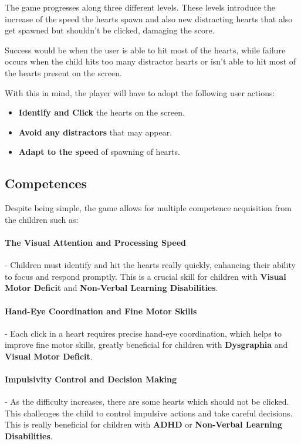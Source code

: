 The game progresses along three different levels. These levels introduce the increase of the speed the hearts spawn and also new distracting hearts that also get spawned but shouldn't be clicked, damaging the score.

Success would be when the user is able to hit most of the hearts, while failure occurs when the child hits too many distractor hearts or isn't able to hit most of the hearts present on the screen.

With this in mind, the player will have to adopt the following user actions:

\begin{itemize}
    \item \textbf{Identify and Click} the hearts on the screen.
    \item \textbf{Avoid any distractors} that may appear.
    \item \textbf{Adapt to the speed} of spawning of hearts.
\end{itemize}

\subsection*{Competences}
Despite being simple, the game allows for multiple competence acquisition from the children such as:

\paragraph{The Visual Attention and Processing Speed}- Children must identify and hit the hearts really quickly, enhancing their ability to focus and respond promptly. This is a crucial skill for children with \textbf{Visual Motor Deficit} and \textbf{Non-Verbal Learning Disabilities}.

\paragraph{Hand-Eye Coordination and Fine Motor Skills}- Each click in a heart requires precise hand-eye coordination, which helps to improve fine motor skills, greatly beneficial for children with \textbf{Dysgraphia} and \textbf{Visual Motor Deficit}.

\paragraph{Impulsivity Control and Decision Making}- As the difficulty increases, there are some hearts which should not be clicked. This challenges the child to control impulsive actions and take careful decisions. This is really beneficial for children with \textbf{ADHD} or \textbf{Non-Verbal Learning Disabilities}.

